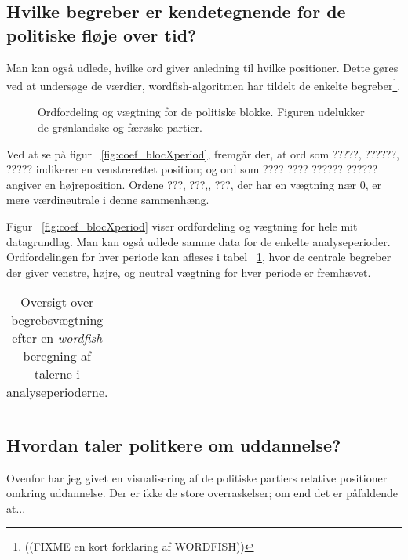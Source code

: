 \subsection{Hvilke begreber er kendetegnende for de politiske fløje over tid?}

Man kan også udlede, hvilke ord giver anledning til hvilke positioner.
Dette gøres ved at undersøge de værdier, wordfish-algoritmen har tildelt de enkelte begreber\footnote{((FIXME en kort forklaring af WORDFISH))}.

\begin{figure}
\begin{adjustwidth}{-8em}{-8em}
  
\end{adjustwidth}
\caption{Ordfordeling og vægtning for de politiske blokke. Figuren udelukker de grønlandske og færøske partier.}
\label{fig:coef_partyXperiod}
\end{figure}

Ved at se på figur ~\ref{fig:coef_blocXperiod}, fremgår der, at ord som ?????, ??????, ????? indikerer en venstrerettet position; og ord som ???? ???? ?????? ?????? angiver en højreposition.
Ordene ???, ???,, ???, der har en vægtning nær 0, er mere værdineutrale i denne sammenhæng.

Figur ~\ref{fig:coef_blocXperiod} viser ordfordeling og vægtning for hele mit datagrundlag.
Man kan også udlede samme data for de enkelte analyseperioder.
Ordfordelingen for hver periode kan afleses i tabel ~\ref{tab:lrterms}, hvor de centrale begreber der giver venstre, højre, og neutral vægtning for hver periode er fremhævet.

\begin{table}
\caption{Oversigt over begrebsvægtning efter en \textit{wordfish} beregning af talerne i analyseperioderne.}
\label{tab:lrterms}
\begin{adjustwidth}{-9em}{-9em}
\begin{tabular}{lp{2in}p{2in}p{2in}}

\end{tabular}
\end{adjustwidth}
\end{table}

\subsection{Hvordan taler politkere om uddannelse?}
Ovenfor har jeg givet en visualisering af de politiske partiers relative positioner omkring uddannelse.
Der er ikke de store overraskelser; om end det er påfaldende at...

